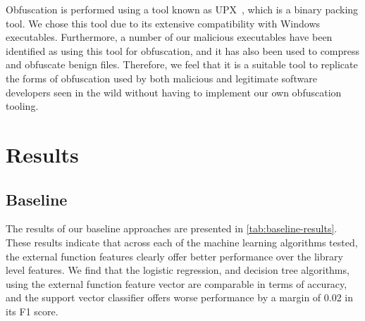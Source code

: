 \documentclass[conference,compsoc]{IEEEtran}
\begin{document}
Obfuscation is performed using a tool known as UPX~\cite{markusf.x.j.oberhumerUPX2025}, which is a binary packing tool. We chose this tool due to its extensive compatibility with Windows executables. Furthermore, a number of our malicious executables have been identified as using this tool for obfuscation, and it has also been used to compress and obfuscate benign files. Therefore, we feel that it is a suitable tool to replicate the forms of obfuscation used by both malicious and legitimate software developers seen in the wild without having to implement our own obfuscation tooling.


\section{Results}

\subsection{Baseline}


\noindent
The results of our baseline approaches are presented in \ref{tab:baseline-results}. These results indicate that across each of the machine learning algorithms tested, the external function features clearly offer better performance over the library level features. We find that the logistic regression, and decision tree algorithms, using the external function feature vector are comparable in terms of accuracy, and the support vector classifier offers worse performance by a margin of 0.02 in its F1 score. 
\end{document}
